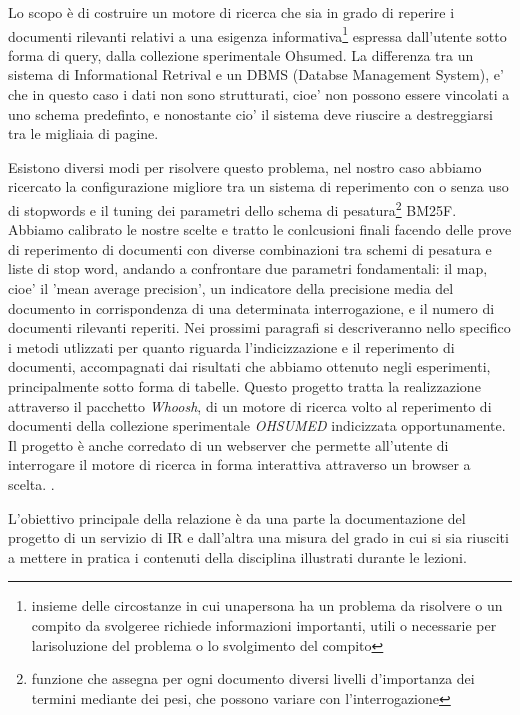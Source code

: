 \documentclass[runningheads]{llncs}
\begin{document}
Lo scopo è di costruire un motore di ricerca che sia in grado di reperire i documenti rilevanti relativi a una esigenza informativa\footnote{insieme delle circostanze in cui unapersona ha un problema da risolvere o un compito da svolgeree richiede informazioni importanti, utili o necessarie per larisoluzione del problema o lo svolgimento del compito}
espressa dall'utente sotto forma di query, dalla collezione sperimentale Ohsumed.
La differenza tra un sistema di Informational Retrival e un DBMS (Databse Management System), e' che in questo caso i dati non sono strutturati, cioe' non possono essere vincolati a uno schema predefinto, e nonostante cio' il sistema deve riuscire a destreggiarsi tra le migliaia di pagine.


Esistono diversi modi per risolvere questo problema, nel nostro caso abbiamo ricercato la configurazione migliore tra un sistema di
reperimento con o senza uso di stopwords e il tuning dei parametri dello schema di pesatura\footnote{funzione che assegna per ogni documento diversi livelli d’importanza dei termini mediante dei pesi, che possono variare con l’interrogazione} BM25F.
Abbiamo calibrato le nostre scelte e tratto le conlcusioni finali facendo delle prove di reperimento di documenti con diverse combinazioni tra schemi di pesatura e liste di stop word, andando a confrontare due parametri fondamentali: il map, cioe' il 'mean average precision', un indicatore della precisione media del documento in corrispondenza di una determinata interrogazione, e il numero di documenti rilevanti reperiti.
Nei prossimi paragrafi si descriveranno nello specifico i metodi utlizzati per quanto riguarda l'indicizzazione e il reperimento di documenti, accompagnati dai risultati che abbiamo ottenuto negli esperimenti, principalmente sotto forma di tabelle.
Questo progetto tratta la realizzazione attraverso il pacchetto \emph{Whoosh}, di un motore di ricerca
volto al reperimento di documenti della collezione sperimentale \emph{OHSUMED} indicizzata opportunamente.
Il progetto è anche corredato di un webserver che permette all'utente di interrogare il motore di ricerca
in forma interattiva attraverso un browser a scelta.
\cite{WBC}.




L'obiettivo principale della relazione \`e da una parte la
documentazione del progetto di un servizio di {IR} e dall'altra una
misura del grado in cui si sia riusciti a mettere in pratica i
contenuti della disciplina illustrati durante le lezioni.
\end{document}

